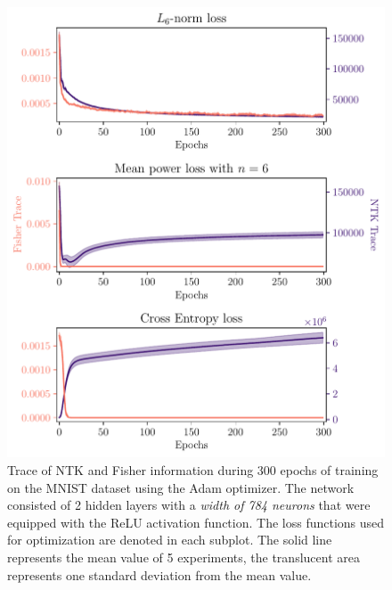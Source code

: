 \begin{figure}
	\centering
	\includegraphics[width=\textwidth]{text/results/FisherNTKComparisonPlots/Triple_comparison_losses6_784.pdf}
	\caption{Trace of NTK and Fisher information during 300 epochs of training on the MNIST dataset using the Adam optimizer. The network consisted of 2 hidden layers with a \emph{width of 784 neurons} that were equipped with the ReLU activation function. The loss functions used for optimization are denoted in each subplot. The solid line represents the mean value of 5 experiments, the translucent area represents one standard deviation from the mean value.}
	\label{fig:MNISTTraceComparison5}
\end{figure}